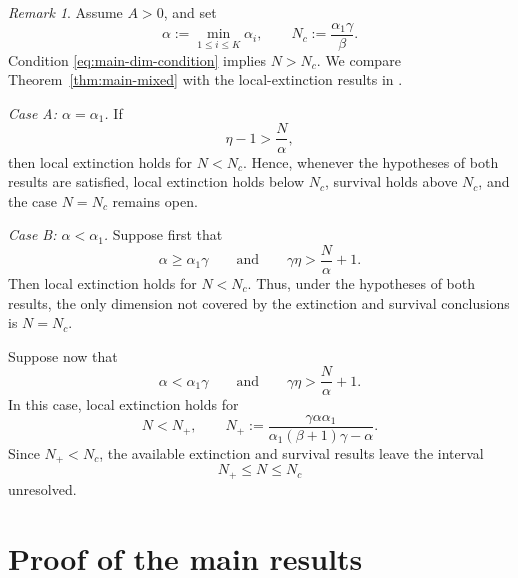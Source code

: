 \documentclass[reqno,final,11pt]{amsart}
\theoremstyle{plain}
\theoremstyle{definition}
\theoremstyle{remark}
\newtheorem{remark}[theorem]{Remark}
\numberwithin{equation}{section}
\begin{document}
\begin{remark}
Assume \(A>0\), and set
\[
  \alpha:=\min_{1\le i\le K}\alpha_i,
  \qquad
  N_c:=\frac{\alpha_1\gamma}{\beta}.
\]
Condition \eqref{eq:main-dim-condition} implies \(N>N_c\). We compare Theorem~\ref{thm:main-mixed} with the local-extinction results in \cite[Theorems~2--4]{Kevei}.

\emph{Case A: \(\alpha=\alpha_1\).} If
\[
  \eta-1>\frac{N}{\alpha},
\]
then local extinction holds for \(N<N_c\). Hence, whenever the hypotheses of both results are satisfied, local extinction holds below \(N_c\), survival holds above \(N_c\), and the case \(N=N_c\) remains open.

\emph{Case B: \(\alpha<\alpha_1\).} Suppose first that
\[
  \alpha\ge\alpha_1\gamma
  \qquad\text{and}\qquad
  \gamma\eta>\frac{N}{\alpha}+1.
\]
Then local extinction holds for \(N<N_c\). Thus, under the hypotheses of both results, the only dimension not covered by the extinction and survival conclusions is \(N=N_c\).

Suppose now that
\[
  \alpha<\alpha_1\gamma
  \qquad\text{and}\qquad
  \gamma\eta>\frac{N}{\alpha}+1.
\]
In this case, local extinction holds for
\[
  N<N_+,
  \qquad
  N_+:=
  \frac{\gamma\alpha\alpha_1}
       {\alpha_1(\beta+1)\gamma-\alpha}.
\]
Since \(N_+<N_c\), the available extinction and survival results leave the interval
\[
  N_+\le N\le N_c
\]
unresolved.
\end{remark}



\section{Proof of the main results}\label{sec:main-proof}
\end{document}
